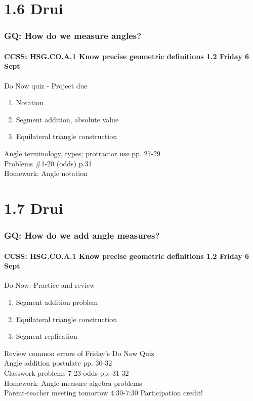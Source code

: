 \documentclass{beamer}
\begin{document}
\section{1.6 Drui}
  \frame
  {
    \frametitle{GQ: How do we measure angles?}
    \framesubtitle{CCSS: HSG.CO.A.1 Know precise geometric definitions \hfill \alert{1.2 Friday 6 Sept}}

    \begin{block}{Do Now quiz - \alert{Project due}}
    \begin{enumerate}
        \item Notation
        \item Segment addition, absolute value
        \item Equilateral triangle construction
    \end{enumerate}
    \end{block}
    Angle terminology, types; protractor use pp. 27-29\\
    Problems \#1-20 (odds) p.31\\
    \vspace{1cm}
    Homework: Angle notation
  }

\section{1.7 Drui}
  \frame
  {
    \frametitle{GQ: How do we add angle measures?}
    \framesubtitle{CCSS: HSG.CO.A.1 Know precise geometric definitions \hfill \alert{1.2 Friday 6 Sept}}

    \begin{block}{Do Now: Practice and review}
    \begin{enumerate}
        \item Segment addition problem
        \item Equilateral triangle construction
        \item Segment replication
    \end{enumerate}
    \end{block}
    Review common errors of Friday's Do Now Quiz\\
    Angle addition postulate pp. 30-32\\
    Classwork problems 7-23 odds pp. 31-32\\
    \vspace{1cm}
    Homework: Angle measure algebra problems\\
    Parent-teacher meeting tomorrow 4:30-7:30 \alert{Participation credit!}
  }
\end{document}
